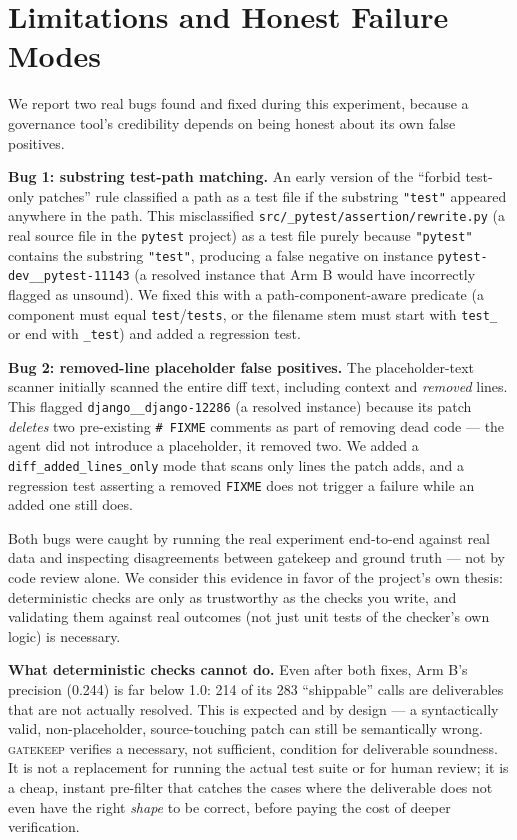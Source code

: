 \documentclass{article}
\begin{document}
\section{Limitations and Honest Failure Modes}
\label{sec:limitations}

We report two real bugs found and fixed during this experiment, because a
governance tool's credibility depends on being honest about its own false
positives.

\textbf{Bug 1: substring test-path matching.} An early version of the
``forbid test-only patches'' rule classified a path as a test file if the
substring \texttt{"test"} appeared anywhere in the path. This
misclassified \texttt{src/\_pytest/assertion/rewrite.py} (a real source
file in the \texttt{pytest} project) as a test file purely because
\texttt{"pytest"} contains the substring \texttt{"test"}, producing a
false negative on instance \texttt{pytest-dev\_\_pytest-11143} (a resolved
instance that Arm B would have incorrectly flagged as unsound). We fixed
this with a path-component-aware predicate (a component must equal
\texttt{test}/\texttt{tests}, or the filename stem must start with
\texttt{test\_} or end with \texttt{\_test}) and added a regression test.

\textbf{Bug 2: removed-line placeholder false positives.} The
placeholder-text scanner initially scanned the entire diff text, including
context and \emph{removed} lines. This flagged
\texttt{django\_\_django-12286} (a resolved instance) because its patch
\emph{deletes} two pre-existing \texttt{\# FIXME} comments as part of
removing dead code --- the agent did not introduce a placeholder, it
removed two. We added a \texttt{diff\_added\_lines\_only} mode that scans
only lines the patch adds, and a regression test asserting a removed
\texttt{FIXME} does not trigger a failure while an added one still does.

Both bugs were caught by running the real experiment end-to-end against
real data and inspecting disagreements between gatekeep and ground truth
--- not by code review alone. We consider this evidence in favor of the
project's own thesis: deterministic checks are only as trustworthy as the
checks you write, and validating them against real outcomes (not just unit
tests of the checker's own logic) is necessary.

\textbf{What deterministic checks cannot do.} Even after both fixes, Arm
B's precision (0.244) is far below 1.0: 214 of its 283 ``shippable'' calls
are deliverables that are not actually resolved. This is expected and by
design --- a syntactically valid, non-placeholder, source-touching patch
can still be semantically wrong. \textsc{gatekeep} verifies a necessary,
not sufficient, condition for deliverable soundness. It is not a
replacement for running the actual test suite or for human review; it is
a cheap, instant pre-filter that catches the cases where the deliverable
does not even have the right \emph{shape} to be correct, before paying the
cost of deeper verification.
\end{document}
